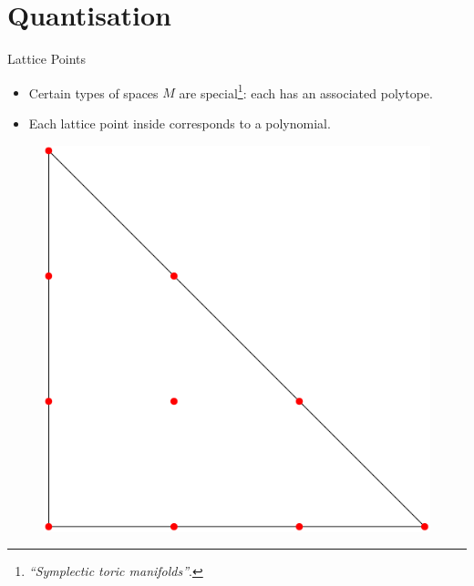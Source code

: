 \section{Quantisation}

\begin{frame}{Lattice Points}

    \begin{itemize}
       \item Certain types of spaces $M$ are special\footnote{\emph{``Symplectic toric manifolds''}.}: each has an associated polytope.
       \item Each lattice point inside corresponds to a polynomial.
    \end{itemize}

    \begin{figure}
        \includegraphics[scale=0.25]{resources/polynomials.png}
    \end{figure}

\end{frame}

